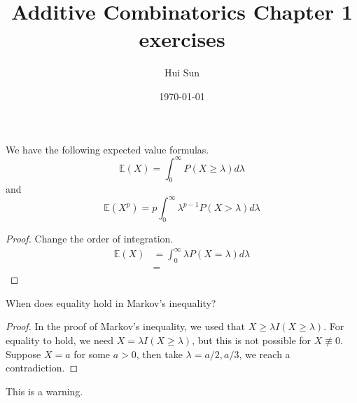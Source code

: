 \documentclass[openany]{book}
\title{Additive Combinatorics Chapter 1 exercises}
\date{\today}
\author{Hui Sun}
\newcommand{\E}{\mathbb{E}}
\begin{document}
\maketitle


\begin{prob}
    We have the following expected value formulas.
    \begin{equation*}
        \E(X)=\int_0^\infty P(X\geq\lambda)d\lambda
    \end{equation*}
    and
    \begin{equation*}
        \E(X^p)=p\int_0^\infty\lambda^{p-1}P(X>\lambda)d\lambda
    \end{equation*}
\end{prob}
\begin{proof}
    Change the order of integration.
    \begin{align*}
        \E(X)&=\int_0^\infty\lambda P(X=\lambda)d\lambda\\
        &=
    \end{align*}
\end{proof}

\begin{prob}
    When does equality hold in Markov's inequality?
\end{prob}
\begin{proof}
    In the proof of Markov's inequality, we used that $X\geq\lambda I(X\geq\lambda)$. For equality to hold, we need $X=\lambda I(X\geq\lambda)$, but this is not possible for $X\not\equiv 0$. Suppose $X=a$ for some $a>0$, then take $\lambda=a/2, a/3$, we reach a contradiction.
\end{proof}

\begin{warn}
    This is a warning.
\end{warn}
\end{document}

